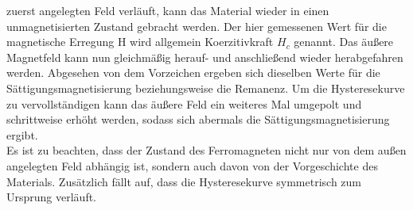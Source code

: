 zuerst angelegten Feld verläuft, kann das Material wieder in einen unmagnetisierten Zustand gebracht werden. Der hier gemessenen Wert 
für die magnetische Erregung H wird allgemein Koerzitivkraft $H_c$ genannt. Das äußere Magnetfeld kann nun gleichmäßig herauf- und anschließend wieder herabgefahren werden.
Abgesehen von dem Vorzeichen ergeben sich dieselben Werte für die Sättigungsmagnetisierung beziehungsweise die Remanenz. Um die Hysteresekurve
zu vervollständigen kann das äußere Feld ein weiteres Mal umgepolt und schrittweise erhöht werden, sodass sich abermals die Sättigungsmagnetisierung
ergibt. 
\\
Es ist zu beachten, dass der Zustand des Ferromagneten nicht nur von dem außen angelegten Feld abhängig ist, sondern auch davon
von der Vorgeschichte des Materials. Zusätzlich fällt auf, dass die Hysteresekurve symmetrisch zum Ursprung verläuft.
